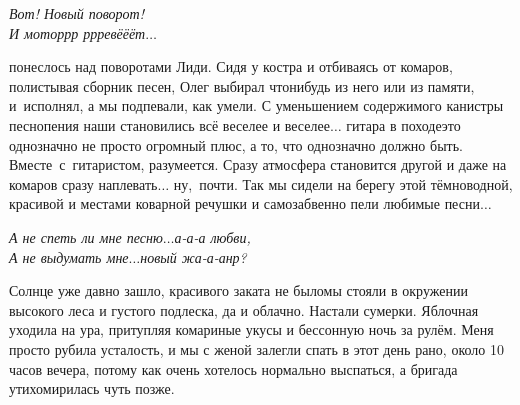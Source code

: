 \vspace{0.1cm}
\noindent\textit{%
	\hspace*{3.5cm}Вот! Новый поворот!\\
	\hspace*{3.5cm}И мотор\sdash р\sdash р  р\sdash р\sdash ревё\sdash ё\sdash ёт$\ldots$
}
\vspace{0.1cm}

\noindent\mdash понеслось над поворотами Лиди. Сидя у костра и отбиваясь от комаров, полистывая сборник песен, Олег выбирал что\sdash нибудь из него или из памяти, и~исполнял, а мы подпевали, как умели. С уменьшением содержимого канистры песнопения наши становились всё веселее и веселее$\ldots$ гитара в походе\mdash это однозначно не просто огромный плюс, а то, что однозначно должно быть. Вместе~с~гитаристом, разумеется. Сразу атмосфера становится другой и даже на комаров сразу наплевать$\ldots$ ну,~почти. Так мы сидели на берегу этой тёмноводной, красивой и местами коварной речушки и самозабвенно пели любимые песни$\ldots$

\vspace{0.1cm}
\noindent\textit{%
	\hspace*{2.0cm}А не спеть ли мне песню$\ldots$а-а-а любви,\\
	\hspace*{2.0cm}А не выдумать мне$\ldots$новый жа-а-анр?
}

Солнце уже давно зашло, красивого заката не было\mdash мы стояли в окружении высокого леса и густого подлеска, да и облачно. Настали сумерки. Яблочная уходила на ура, притупляя комариные укусы и бессонную ночь за рулём. Меня просто рубила усталость, и мы с женой залегли спать в этот день рано, около 10 часов вечера, потому как очень хотелось нормально выспаться, а бригада утихомирилась чуть позже.

\begin{center}
\end{center}
